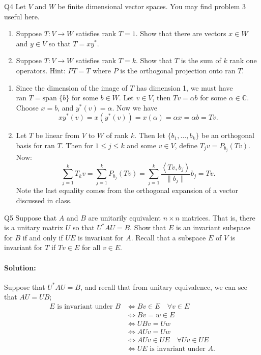 \documentclass{article}
\begin{document}
\begin{prob}{Q4}
Let $V$ and $W$ be finite dimensional vector spaces. You may find problem 3 useful here.
\begin{enumerate}[label= (\alph*)] 
    \item Suppose $T: V \to W$ satisfies $\text{rank } T = 1$. Show that there are vectors $x \in W$ and $y \in V$ so that $T = xy^*$.
    \item Suppose $T: V \to W$ satisfies $\text{rank } T = k$. Show that $T$ is the sum of $k$ rank one operators. Hint: $PT = T$ where $P$ is the orthogonal projection onto $\text{ran } T$.
\end{enumerate}
\end{prob}
\begin{enumerate}[label= (\alph*)] 
    \item Since the dimension of the image of $T$ has dimension 1, we must have $\text{ran }T=\text{span }\{b\} $ for some $b\in W$. Let $v\in V$, then $Tv=\alpha b$ for some $\alpha\in \mathbb{C}$. Choose $x=b$, and $y^*(v)=\alpha$. Now we have 
        \[
        xy^* (v)=x(y^* (v))=x(\alpha)=\alpha x=\alpha b= Tv
        .\] 

    \item Let $T$ be linear from $V$ to $W$ of rank $k$. Then let $\{b_1,\dots,b_k\} $ be an orthogonal basis for $\text{ran }T$. Then for $1\leq j\leq k$ and some $v\in V$, define $T_jv=P_{b_j}(Tv)$. Now:
        \[
            \sum_{j=1}^{k} T_k v=\sum_{j=1}^{k} P_{b_j}(Tv)=\sum_{j=1}^{k} \frac{\left<Tv,b_j \right>}{\|b_j\|}b_j=Tv
        .\] 
        Note the last equality comes from the orthogonal expansion of a vector discussed in class.%
\end{enumerate}

\begin{prob}{Q5}
Suppose that $A$ and $B$ are unitarily equivalent $n \times n$ matrices. That is, there is a unitary matrix $U$ so that $U^*AU = B$. Show that $E$ is an invariant subspace for $B$ if and only if $UE$ is invariant for $A$.
Recall that a subspace $E$ of $V$ is invariant for $T$ if $Tv \in E$ for all $v \in E$.
\end{prob}
\paragraph{Solution: }Suppose that $ U^* AU=B$, and recall that from unitary equivalence, we can see that $AU=UB$;
\begin{align*}
    E \text{ is invariant under }B&\iff Bv\in E\quad\forall v\in E\\
                        &\iff Bv=w\in E\\
                         &\iff UBv=Uw\\
                         &\iff AUv=Uw\\
                         &\iff AUv\in UE\quad \forall Uv\in UE\\
                         &\iff  UE \text{ is invariant under } A
.\end{align*}
\end{document}
